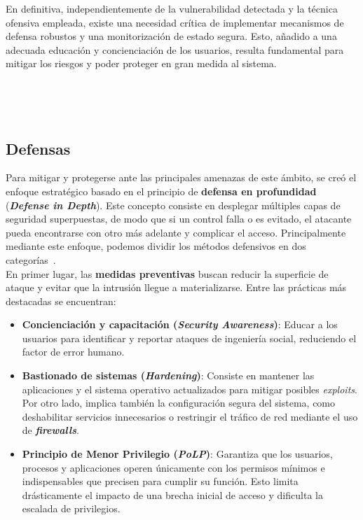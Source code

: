 En definitiva, independientemente de la vulnerabilidad detectada y la técnica ofensiva empleada, existe una necesidad crítica de implementar mecanismos de defensa robustos y una monitorización de estado segura.
Esto, añadido a una adecuada educación y concienciación de los usuarios, resulta fundamental para mitigar los riesgos y poder proteger en gran medida al sistema.

\

\

\subsection{Defensas}
\label{sec:defensas}

Para mitigar y protegerse ante las principales amenazas de este ámbito, se creó el enfoque estratégico basado en el principio de \textbf{defensa en profundidad} (\textbf{\textit{Defense in Depth}}).
Este concepto consiste en desplegar múltiples capas de seguridad superpuestas, de modo que si un control falla o es evitado, el atacante pueda encontrarse con otro más adelante y complicar el acceso.
Principalmente mediante este enfoque, podemos dividir los métodos defensivos en dos categorías~\cite{nist_sec_controls}.\\

En primer lugar, las \textbf{medidas preventivas} buscan reducir la superficie de ataque y evitar que la intrusión llegue a materializarse. Entre las prácticas más destacadas se encuentran:
\begin{itemize}
    \item \textbf{Concienciación y capacitación (\textit{Security Awareness})}: Educar a los usuarios para identificar y reportar ataques de ingeniería social, reduciendo el factor de error humano.
    \item \textbf{Bastionado de sistemas (\textit{Hardening})}: Consiste en mantener las aplicaciones y el sistema operativo actualizados para mitigar posibles \textit{exploits}.
    Por otro lado, implica también la configuración segura del sistema, como deshabilitar servicios innecesarios o restringir el tráfico de red mediante el uso de \textbf{\textit{firewalls}}.
    \item \textbf{Principio de Menor Privilegio (\textit{PoLP})}: Garantiza que los usuarios, procesos y aplicaciones operen únicamente con los permisos mínimos e indispensables que precisen para cumplir su función.
    Esto limita drásticamente el impacto de una brecha inicial de acceso y dificulta la escalada de privilegios.
\end{itemize}


